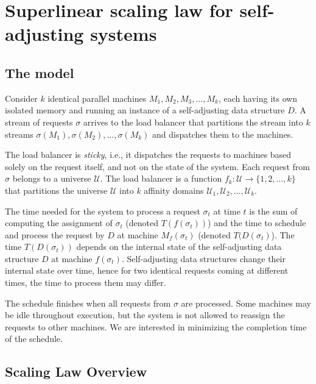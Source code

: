 

\section{Superlinear scaling law for self-adjusting systems}

\subsection{The model}
\label{sec:model}

Consider $k$ identical parallel machines $M_1, M_2, M_3, \ldots, M_k$, each having its own isolated memory and running an instance of a self-adjusting data structure $D$. A stream of requests $\sigma$ arrives to the load balancer that partitions the stream into $k$ streams $\sigma(M_1), \sigma(M_2), \ldots, \sigma(M_k)$ and dispatches them to the machines.

The load balancer is \emph{sticky}, i.e., it dispatches the requests to machines based solely on the request itself, and not on the state of the system.
Each request from $\sigma$ belongs to a universe $\mathcal{U}$. 
The load balancer is a function $f_k : \mathcal{U} \to \{1, 2, \ldots, k\}$ that partitions the universe $\mathcal{U}$ into $k$ affinity domains $\mathcal{U}_1, \mathcal{U}_2, \ldots, \mathcal{U}_k$.

The time needed for the system to process a request $\sigma_t$ at time $t$ is the sum of computing the assignment of $\sigma_t$ (denoted $T(f(\sigma_t))$) and the time to schedule and process the request by $D$ at machine $M_f(\sigma_t)$ (denoted $T(D(\sigma_t)$).
The time $T(D(\sigma_t))$ depends on the internal state of the self-adjusting data structure $D$ at machine $f(\sigma_t)$.
Self-adjusting data structures change their internal state over time, hence for two identical requests coming at different times, the time to process them may differ.

The schedule finishes when all requests from $\sigma$ are processed. Some machines may be idle throughout execution, but the system is not allowed to reassign the requests to other machines.
We are interested in minimizing the completion time of the schedule.


\subsection{Scaling Law Overview}

